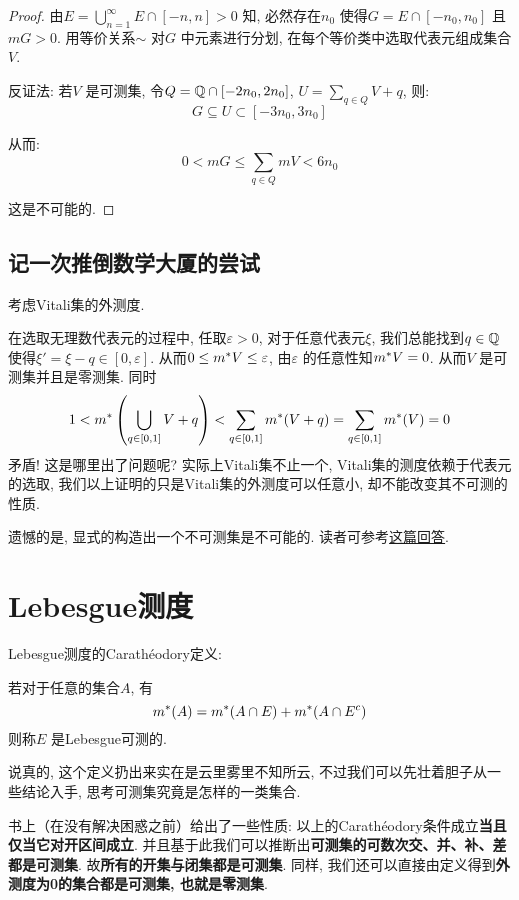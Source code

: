 \begin{proof}
    由\(E= \bigcup_{n=1}^{\infty} E\cap [-n,n]>0\) 知,
    必然存在\(n_{0}\) 使得\(G=E\cap [-n_{0},n_{0}]\) 且\(mG>0\).
    用等价关系\(\sim\) 对\(G\) 中元素进行分划, 在每个等价类中选取代表元组成集合\(V\).

    反证法: 若\(V\) 是可测集, 令\(Q=\mathbb{Q}\cap[-2n_{0},2n_{0}]\),
    \(U=\sum_{q\in Q} V+q\), 则:
    \[
        G \subseteq U \subset [-3n_{0},3n_{0}]
    \]

    从而: \[
        0<m G\leq \sum_{q\in Q} mV<6n_{0}
    \]

    这是不可能的.
\end{proof}

\subsection{记一次推倒数学大厦的尝试}
考虑Vitali集的外测度.

在选取无理数代表元的过程中, 任取\(\varepsilon>0\), 对于任意代表元\(\xi\),
我们总能找到\(q \in \mathbb{Q}\) 使得\(\xi'=\xi-q \in [0,\varepsilon]\).
从而\(0\leq m^{*} V\leq \varepsilon\), 由\(\varepsilon\)
的任意性知\(m^{*} V=0\). 从而\(V\) 是可测集并且是零测集. 同时\[
    1<m^{*}\left( \bigcup_{q\in [0,1]} V+q  \right) < \sum_{q
    \in [0,1]} m^{*}(V+q) = \sum_{q\in [0,1]} m^{*}(V) = 0
\]
矛盾!
这是哪里出了问题呢? 实际上Vitali集不止一个, Vitali集的测度依赖于代表元的选取,
我们以上证明的只是Vitali集的外测度可以任意小, 却不能改变其不可测的性质.

遗憾的是, 显式的构造出一个不可测集是不可能的.
读者可参考\href{https://math.stackexchange.com/questions/226559/examples-of-non-measurable-sets-in-mathbbr}{这篇回答}.

\section{Lebesgue测度}
Lebesgue测度的Carathéodory定义:
\begin{definition}
    若对于任意的集合\(A\), 有
    \[
        m^{*}(A)=m^{*}(A\cap E)+m^{*}(A\cap E^{c})
    \]
    则称\(E\) 是Lebesgue可测的.
\end{definition}

说真的, 这个定义扔出来实在是云里雾里不知所云, 不过我们可以先壮着胆子从一些结论入手, 思考可测集究竟是怎样的一类集合.

书上（在没有解决困惑之前）给出了一些性质: 以上的Carathéodory条件成立\textbf{当且仅当它对开区间成立}.
并且基于此我们可以推断出\textbf{可测集的可数次交、并、补、差都是可测集}. 故\textbf{所有的开集与闭集都是可测集}.
同样, 我们还可以直接由定义得到\textbf{外测度为0的集合都是可测集, 也就是零测集}.

